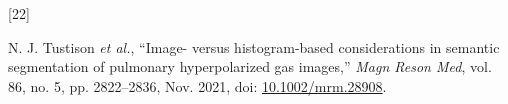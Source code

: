\documentclass[
  11pt,
]{article}
\newlength{\cslhangindent}
\newlength{\csllabelwidth}
\newenvironment{CSLReferences}[2] %
 {%
  \setlength{\parindent}{0pt}
  \ifodd #1 \everypar{\setlength{\hangindent}{\cslhangindent}}\ignorespaces\fi
  \ifnum #2 > 0
  \setlength{\parskip}{#2\baselineskip}
  \fi
 }%
 {}
\newcommand{\CSLLeftMargin}[1]{\parbox[t]{\csllabelwidth}{#1}}
\newcommand{\CSLRightInline}[1]{\parbox[t]{\linewidth - \csllabelwidth}{#1}\break}
\begin{document}
\begin{CSLReferences}{0}{0}
\leavevmode{}%
\CSLLeftMargin{{[}22{]} }
\CSLRightInline{N. J. Tustison \emph{et al.}, {``Image- versus
histogram-based considerations in semantic segmentation of pulmonary
hyperpolarized gas images,''} \emph{Magn Reson Med}, vol. 86, no. 5, pp.
2822--2836, Nov. 2021, doi:
\href{https://doi.org/10.1002/mrm.28908}{10.1002/mrm.28908}.}

\end{CSLReferences}
\end{document}

